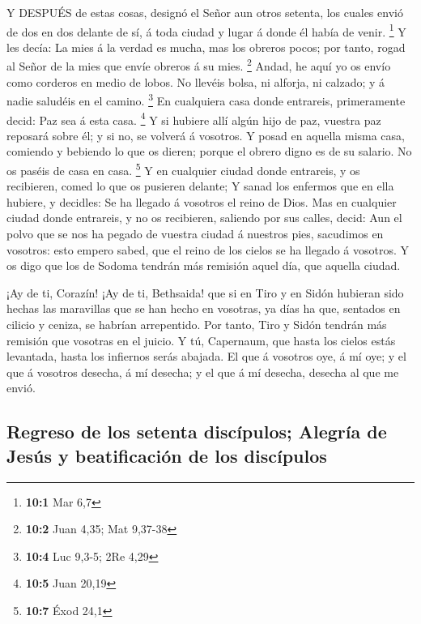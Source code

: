  Y DESPUÉS de estas cosas, designó el Señor aun otros
setenta, los cuales envió de dos en dos delante de sí, á toda ciudad y
lugar á donde él había de venir. \footnote{\textbf{10:1} Mar 6,7}
 Y les decía: La mies á la verdad es mucha, mas los obreros
pocos; por tanto, rogad al Señor de la mies que envíe obreros á su mies.
\footnote{\textbf{10:2} Juan 4,35; Mat 9,37-38}  Andad, he
aquí yo os envío como corderos en medio de lobos.  No
llevéis bolsa, ni alforja, ni calzado; y á nadie saludéis en el camino.
\footnote{\textbf{10:4} Luc 9,3-5; 2Re 4,29}  En cualquiera
casa donde entrareis, primeramente decid: Paz sea á esta casa.
\footnote{\textbf{10:5} Juan 20,19}  Y si hubiere allí algún
hijo de paz, vuestra paz reposará sobre él; y si no, se volverá á
vosotros.  Y posad en aquella misma casa, comiendo y
bebiendo lo que os dieren; porque el obrero digno es de su salario. No
os paséis de casa en casa. \footnote{\textbf{10:7} Éxod 24,1}
 Y en cualquier ciudad donde entrareis, y os recibieren,
comed lo que os pusieren delante;  Y sanad los enfermos que
en ella hubiere, y decidles: Se ha llegado á vosotros el reino de Dios.
 Mas en cualquier ciudad donde entrareis, y no os
recibieren, saliendo por sus calles, decid:  Aun el polvo
que se nos ha pegado de vuestra ciudad á nuestros pies, sacudimos en
vosotros: esto empero sabed, que el reino de los cielos se ha llegado á
vosotros.  Y os digo que los de Sodoma tendrán más remisión
aquel día, que aquella ciudad.

 ¡Ay de ti, Corazín! ¡Ay de ti, Bethsaida! que si en Tiro y
en Sidón hubieran sido hechas las maravillas que se han hecho en
vosotras, ya días ha que, sentados en cilicio y ceniza, se habrían
arrepentido.  Por tanto, Tiro y Sidón tendrán más remisión
que vosotras en el juicio.  Y tú, Capernaum, que hasta los
cielos estás levantada, hasta los infiernos serás abajada. 
El que á vosotros oye, á mí oye; y el que á vosotros desecha, á mí
desecha; y el que á mí desecha, desecha al que me envió.

\hypertarget{regreso-de-los-setenta-discuxedpulos-alegruxeda-de-jesuxfas-y-beatificaciuxf3n-de-los-discuxedpulos}{%
\subsection{Regreso de los setenta discípulos; Alegría de Jesús y
beatificación de los
discípulos}\label{regreso-de-los-setenta-discuxedpulos-alegruxeda-de-jesuxfas-y-beatificaciuxf3n-de-los-discuxedpulos}}

